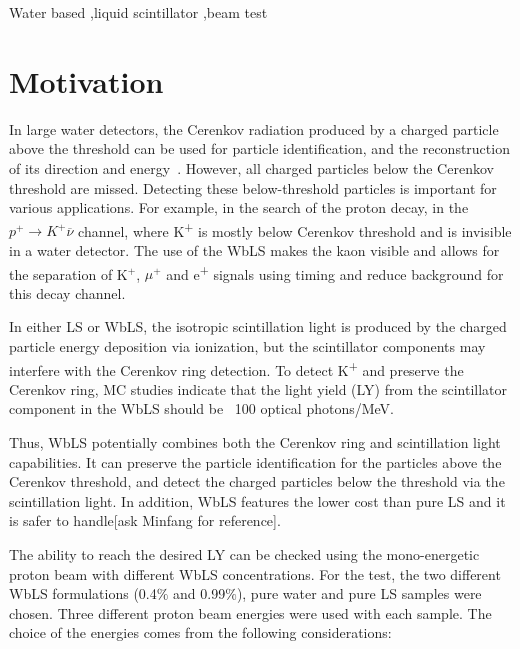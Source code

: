 \documentclass[preprint,12pt]{elsarticle}
\begin{document}
\begin{frontmatter}
\begin{abstract}
\end{abstract}

\begin{keyword}
Water based \sep liquid scintillator \sep beam test

\end{keyword}

\end{frontmatter}

 \linenumbers

\section{Motivation}
\label{introAndMotivation}
In large water detectors, the Cerenkov radiation produced by a charged particle above the threshold can be used for particle identification, and the reconstruction of its direction and energy~\cite{superKkinematik}. However, all charged particles below the Cerenkov threshold are missed. Detecting these below-threshold particles is important for various applications. For example, in the search of the proton decay, in the $p^{+} \rightarrow K^{+} \overline{\nu}$ channel, where K\textsuperscript{+} is mostly below Cerenkov threshold and is invisible in a water detector. The use of the WbLS makes the kaon visible and allows for the 
separation of K$^{+}$, $\mu^{+}$ and e\textsuperscript{+} signals using timing and reduce background for this decay channel.

In either LS or WbLS, the isotropic scintillation light is produced by the charged particle energy deposition via ionization, but the scintillator components may interfere with the Cerenkov ring detection. To detect K\textsuperscript{+} and preserve the Cerenkov ring, MC studies indicate that the light yield (LY) from the scintillator component in the WbLS should be ~100 optical photons/MeV.

Thus, WbLS potentially combines both the Cerenkov ring and scintillation light capabilities. It can preserve the particle identification for the particles above the Cerenkov threshold, and detect the charged particles below the threshold via the scintillation light. In addition, WbLS features the lower cost than pure LS and it is safer to handle[ask Minfang for reference].

The ability to reach the desired LY can be checked using the mono-energetic proton beam with different WbLS concentrations. For the test, the two different WbLS formulations (0.4$\%$ and 0.99$\%$), pure water and pure LS samples were chosen. Three different proton beam energies were used with each sample. The choice of the energies comes from the following considerations: 
\end{document}

